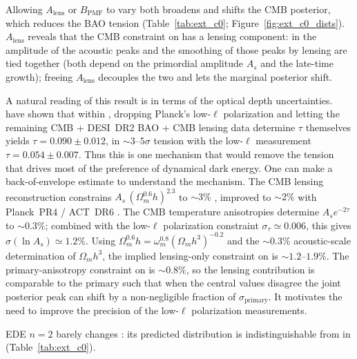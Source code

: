 Allowing $A_\mathrm{lens}$ or $B_\mathrm{PMF}$ to vary both broadens and shifts the CMB \omh posterior, which reduces the BAO \czero tension (Table~\ref{tab:ext_c0}; Figure~\ref{fig:ext_c0_dists}). $A_\mathrm{lens}$ reveals that the CMB constraint on \omh has a lensing component: in \LCDM the amplitude of the acoustic peaks and the smoothing of those peaks by lensing are tied together (both depend on the primordial amplitude $A_s$ and the late-time growth); freeing $A_\mathrm{lens}$ decouples the two and lets the \omh marginal posterior shift.

A natural reading of this result is in terms of the optical depth uncertainties. \citet{Sailer2026} have shown that within \LCDM, dropping Planck's low-$\ell$ polarization and letting the remaining CMB + DESI~DR2 BAO + CMB lensing data determine $\tau$ themselves yields $\tau = 0.090 \pm 0.012$, in $\sim 3$--$5\sigma$ tension with the low-$\ell$ measurement $\tau = 0.054 \pm 0.007$. Thus this is one mechanism that would remove the tension that drives most of the preference of dynamical dark energy. One can make a back-of-envelope estimate to understand the mechanism. The CMB lensing reconstruction constrains $A_s\,(\Omega_m^{0.6} h)^{2.3}$ to $\sim 3\%$ \citep[Planck 2015 XV, Eq.~14;][]{Planck2015lensing}, improved to $\sim 2\%$ with Planck~PR4 / ACT~DR6 \citep[Eq.~49;][]{Qu2023}. The CMB temperature anisotropies determine $A_s e^{-2\tau}$ to $\sim 0.3\%$; combined with the low-$\ell$ polarization constraint $\sigma_\tau \simeq 0.006$, this gives $\sigma(\ln A_s) \simeq 1.2\%$. Using $\Omega_m^{0.6} h = \omega_m^{0.8} (\Omega_m h^3)^{-0.2}$ and the $\sim 0.3\%$ acoustic-scale determination of $\Omega_m h^3$, the implied lensing-only constraint on \omh{} is $\sim 1.2$--$1.9\%$. The primary-anisotropy constraint on \omh{} is $\sim 0.8\%$, so the lensing contribution is comparable to the primary such that when the central values disagree the joint posterior peak can shift by a non-negligible fraction of $\sigma_\mathrm{primary}$. It motivates the need to improve the precision of the low-$\ell$ polarization measurements.

EDE $n = 2$ barely changes \czero: its predicted distribution is indistinguishable from \LCDM in \czero (Table~\ref{tab:ext_c0}).

